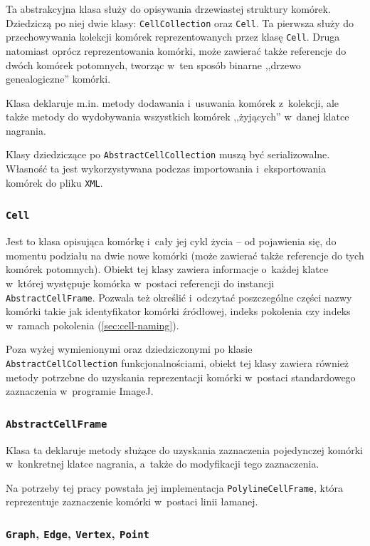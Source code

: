 \documentclass[declaration,shortabstract,mgr]{iithesis}
\begin{document}
Ta abstrakcyjna klasa służy do opisywania drzewiastej struktury komórek. Dziedziczą po niej dwie klasy: \texttt{CellCollection} oraz \texttt{Cell}.
Ta pierwsza służy do przechowywania kolekcji komórek reprezentowanych przez klasę \texttt{Cell}.
Druga natomiast oprócz reprezentowania komórki, może zawierać także referencje do dwóch komórek potomnych, tworząc w~ten sposób binarne ,,drzewo genealogiczne'' komórki.

Klasa deklaruje m.in. metody dodawania i~usuwania komórek z~kolekcji, ale także metody do wydobywania wszystkich komórek ,,żyjących'' w~danej klatce nagrania.

Klasy dziedziczące po \texttt{AbstractCellCollection} muszą być serializowalne.
Własność ta jest wykorzystywana podczas importowania i~eksportowania komórek do pliku \texttt{XML}.

\subsubsection{\texttt{Cell}}

Jest to klasa opisująca komórkę i~cały jej cykl życia -- od pojawienia się, do momentu podziału na dwie nowe komórki (może zawierać także referencje do tych komórek potomnych).
Obiekt tej klasy zawiera informacje o~każdej klatce w~której występuje komórka w~postaci referencji do instancji \texttt{AbstractCellFrame}.
Pozwala też określić i~odczytać poszczególne części nazwy komórki takie jak identyfikator komórki źródłowej, indeks pokolenia czy indeks w~ramach pokolenia (\ref{sec:cell-naming}).

Poza wyżej wymienionymi oraz dziedziczonymi po klasie \texttt{AbstractCellCollection} funkcjonalnościami, obiekt tej klasy zawiera również metody potrzebne do uzyskania reprezentacji komórki w~postaci standardowego zaznaczenia w~programie ImageJ.

\subsubsection{\texttt{AbstractCellFrame}}

Klasa ta deklaruje metody służące do uzyskania zaznaczenia pojedynczej komórki w~konkretnej klatce nagrania, a~także do modyfikacji tego zaznaczenia.

Na potrzeby tej pracy powstała jej implementacja \texttt{PolylineCellFrame}, która reprezentuje zaznaczenie komórki w~postaci linii łamanej.

\subsubsection{\texttt{Graph}, \texttt{Edge}, \texttt{Vertex}, \texttt{Point}}
\end{document}
